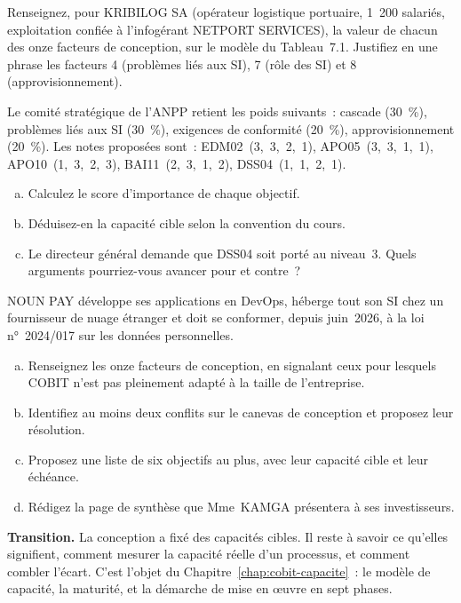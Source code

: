 \bigskip

\begin{boxexo}[title={\ding{45}\quad Exercice~7.1. Les facteurs de KRIBILOG \niveaubase}]
Renseignez, pour KRIBILOG SA (opérateur logistique portuaire, 1~200
salariés, exploitation confiée à l'infogérant NETPORT SERVICES), la valeur
de chacun des onze facteurs de conception, sur le modèle du Tableau~7.1.
Justifiez en une phrase les facteurs 4 (problèmes liés aux SI), 7 (rôle
des SI) et 8 (approvisionnement).
\end{boxexo}

\begin{boxexo}[title={\ding{45}\quad Exercice~7.2. Le profil de l'ANPP \niveaumoyen}]
Le comité stratégique de l'ANPP retient les poids suivants~: cascade
(30~\%), problèmes liés aux SI (30~\%), exigences de conformité (20~\%),
approvisionnement (20~\%). Les notes proposées sont~:
EDM02~(3,~3,~2,~1), APO05~(3,~3,~1,~1), APO10~(1,~3,~2,~3),
BAI11~(2,~3,~1,~2), DSS04~(1,~1,~2,~1).
\begin{enumerate}[(a)]
    \item Calculez le score d'importance de chaque objectif.
    \item Déduisez-en la capacité cible selon la convention du cours.
    \item Le directeur général demande que DSS04 soit porté au niveau~3.
          Quels arguments pourriez-vous avancer pour et contre~?
\end{enumerate}
\end{boxexo}

\begin{boxexo}[title={\ding{45}\quad Exercice~7.3. Concevoir le système de NOUN PAY \niveauexpert}]
NOUN PAY développe ses applications en DevOps, héberge tout son SI chez un
fournisseur de nuage étranger et doit se conformer, depuis juin~2026, à la
loi n°~2024/017 sur les données personnelles.
\begin{enumerate}[(a)]
    \item Renseignez les onze facteurs de conception, en signalant ceux pour
          lesquels COBIT n'est pas pleinement adapté à la taille de
          l'entreprise.
    \item Identifiez au moins deux conflits sur le canevas de conception et
          proposez leur résolution.
    \item Proposez une liste de six objectifs au plus, avec leur capacité
          cible et leur échéance.
    \item Rédigez la page de synthèse que Mme~KAMGA présentera à ses
          investisseurs.
\end{enumerate}
\end{boxexo}

\bigskip

\begin{boxinfo}
\textbf{Transition.} La conception a fixé des capacités cibles. Il reste à
savoir ce qu'elles signifient, comment mesurer la capacité réelle d'un
processus, et comment combler l'écart. C'est l'objet du
Chapitre~\ref{chap:cobit-capacite}~: le modèle de capacité, la maturité,
et la démarche de mise en œuvre en sept phases.
\end{boxinfo}

